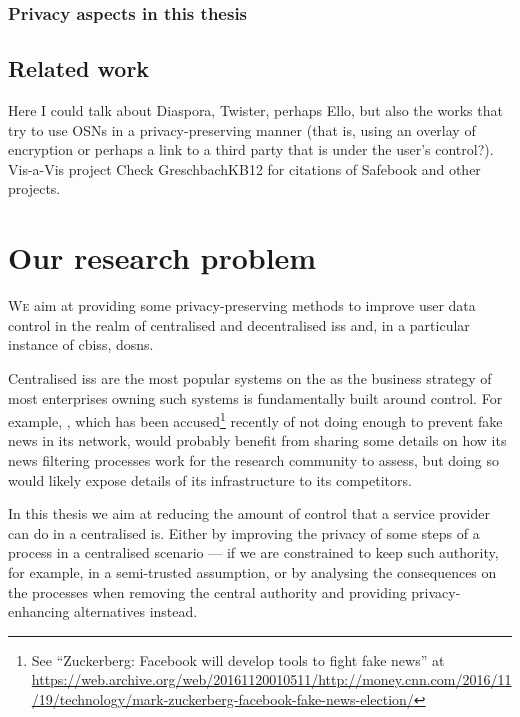 \documentclass[showtrims,oldfontcommands]{kthesis}
\begin{document}
\subsection{Privacy aspects in this thesis}
    \label{subsection:privacy-aspects-in-this-thesis}


\section{Related work}
    \label{section:related-work}


Here I could talk about Diaspora, Twister, perhaps Ello, but also the works that try to 
use OSNs in a privacy-preserving manner (that is, using an overlay of encryption 
or perhaps a link to a third party that is under the user's control?).
Vis-a-Vis project
Check GreschbachKB12 for citations of Safebook and other projects.



\chapter{Our research problem}
    \label{chapter:our-research-problem}


\lettrine{\textcolor[gray]{.25}{W}}{e} aim at providing some privacy-preserving 
methods to improve user data control in the realm of centralised and decentralised 
\acp{is} and, in a particular instance of \acp{cbis}, \acp{dosn}.

Centralised \acp{is} are the most popular systems on the \Internet as the business 
strategy of most enterprises owning such systems is fundamentally built around control. 
For example, \Facebook, which has been accused\footnote{See ``Zuckerberg: Facebook will develop tools to fight fake news'' at \url{https://web.archive.org/web/20161120010511/http://money.cnn.com/2016/11/19/technology/mark-zuckerberg-facebook-fake-news-election/}} 
recently of not doing enough to prevent fake news in its network, would probably 
benefit from sharing some details on how its news filtering processes work for the 
research community to assess, but doing so would likely expose details of its infrastructure 
to its competitors.

In this thesis we aim at reducing the amount of control that a service provider 
can do in a centralised \ac{is}. Either by improving the privacy of some steps of 
a process in a centralised scenario --- if we are constrained to keep such authority, 
for example, in a semi-trusted assumption, or by analysing the consequences on the 
processes when removing the central authority and providing privacy-enhancing alternatives 
instead. 
\end{document}
